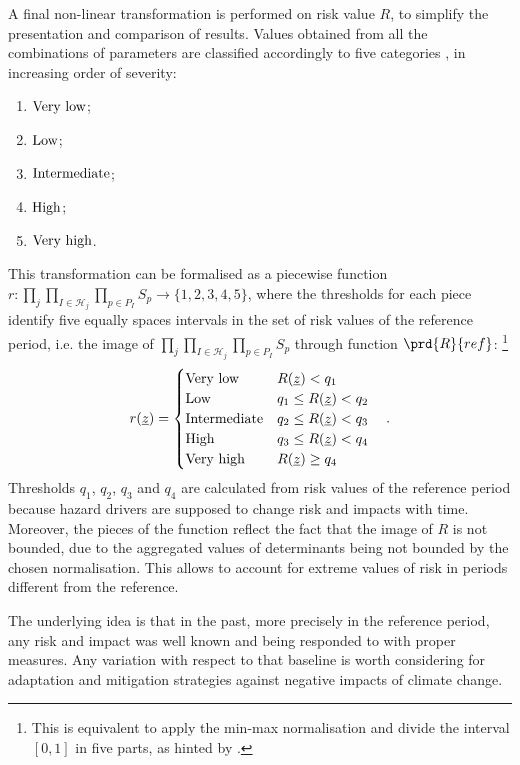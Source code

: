 A final non-linear transformation is performed on \gls{risk} value $R$, to simplify the presentation and comparison of results.
Values obtained from all the combinations of parameters are classified accordingly to five categories \cite[53]{2017GIZRiskSupplement}, in increasing order of severity:
\begin{enumerate}
  \item $\text{Very low}$;
  \item $\text{Low}$;
  \item $\text{Intermediate}$;
  \item $\text{High}$;
  \item $\text{Very high}$.
\end{enumerate}
This transformation can be formalised as a piecewise function $r : \prod_j \prod_{I \in \mathcal{H}_j} \prod_{p \in P_I} S_p \to \{ 1, 2, 3, 4, 5 \}$, where the thresholds for each piece identify five equally spaces intervals in the set of risk values of the reference period, i.e. the image of $\prod_j \prod_{I \in \mathcal{H}_j} \prod_{p \in P_I} S_p$ through function $\prd{R}{ref}$:%
\footnote{This is equivalent to apply the min-max normalisation and divide the interval $[0, 1]$ in five parts, as hinted by \cite[74]{2017GIZVulnerabilitySourcebook}.}
\begin{equation}
  \label{eq:risk_categorical}
  r(\underline{z}) =
  \begin{cases}
    \text{Very low} & R(\underline{z}) < q_1 \\
    \text{Low} & q_1 \le R(\underline{z}) < q_2 \\
    \text{Intermediate} & q_2 \le R(\underline{z}) < q_3 \\
    \text{High} & q_3 \le R(\underline{z}) < q_4 \\
    \text{Very high} & R(\underline{z}) \ge q_4
  \end{cases}
  \quad .
\end{equation}
Thresholds $q_1$, $q_2$, $q_3$ and $q_4$ are calculated from risk values of the reference period because \gls{hazard} \glspl{driver} are supposed to change risk and \glspl{impact} with time. Moreover, the pieces of the function reflect the fact that the image of $R$ is not bounded, due to the aggregated values of \glspl{determinant} being not bounded by the chosen normalisation. This allows to account for extreme values of risk in periods different from the reference.

The underlying idea is that in the past, more precisely in the reference period, any risk and impact was well known and being responded to with proper measures. Any variation with respect to that baseline is worth considering for adaptation and mitigation strategies against negative impacts of climate change.

